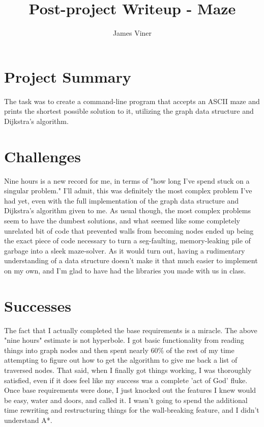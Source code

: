 \documentclass[11pt]{report}
\begin{document}
\title{Post-project Writeup - Maze}
\author{James Viner}
\date{} %

\maketitle

\doublespacing

\section*{Project Summary}
The task was to create a command-line program that accepts an ASCII maze and prints the shortest possible solution to it, utilizing the graph data structure and Dijkstra's algorithm.
\section*{Challenges}
Nine hours is a new record for me, in terms of "how long I've spend stuck on a singular problem." I'll admit, this was definitely the most complex problem I've had yet, even with the full implementation of the graph data structure and Dijkstra's algorithm given to me. As usual though, the most complex problems seem to have the dumbest solutions, and what seemed like some completely unrelated bit of code that prevented walls from becoming nodes ended up being the exact piece of code necessary to turn a seg-faulting, memory-leaking pile of garbage into a sleek maze-solver. As it would turn out, having a rudimentary understanding of a data structure doesn't make it that much easier to implement on my own, and I'm glad to have had the libraries you made with us in class.
\pagebreak
\section*{Successes}
The fact that I actually completed the base requirements is a miracle. The above "nine hours" estimate is not hyperbole. I got basic functionality from reading things into graph nodes and then spent nearly 60\% of the rest of my time attempting to figure out how to get the algorithm to give me back a list of traversed nodes. That said, when I finally got things working, I was thoroughly satisfied, even if it does feel like my success was a complete 'act of God' fluke. Once base requirements were done, I just knocked out the features I knew would be easy, water and doors, and called it. I wasn't going to spend the additional time rewriting and restructuring things for the wall-breaking feature, and I didn't understand A*. 
\end{document}
